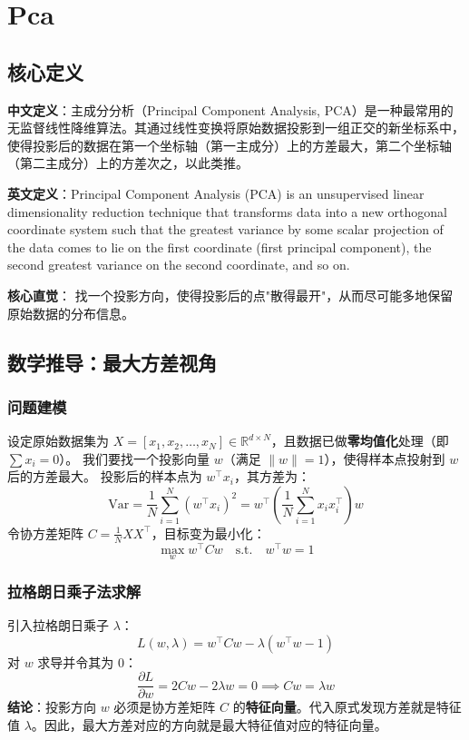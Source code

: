 \documentclass[12pt, a4paper]{book}
\begin{document}
\chapter{Pca}


\section{核心定义}
\textbf{中文定义}：主成分分析（Principal Component Analysis, PCA）是一种最常用的无监督线性降维算法。其通过线性变换将原始数据投影到一组正交的新坐标系中，使得投影后的数据在第一个坐标轴（第一主成分）上的方差最大，第二个坐标轴（第二主成分）上的方差次之，以此类推。

\textbf{英文定义}：Principal Component Analysis (PCA) is an unsupervised linear dimensionality reduction technique that transforms data into a new orthogonal coordinate system such that the greatest variance by some scalar projection of the data comes to lie on the first coordinate (first principal component), the second greatest variance on the second coordinate, and so on.

\textbf{核心直觉}：
找一个投影方向，使得投影后的点"散得最开"，从而尽可能多地保留原始数据的分布信息。

\section{数学推导：最大方差视角}

\subsection{问题建模}
设定原始数据集为 $X = [x_1, x_2, \dots, x_N] \in \mathbb{R}^{d \times N}$，且数据已做\textbf{零均值化}处理（即 $\sum x_i = 0$）。
我们要找一个投影向量 $w$（满足 $\|w\|=1$），使得样本点投射到 $w$ 后的方差最大。
投影后的样本点为 $w^\top x_i$，其方差为：
$$ \text{Var} = \frac{1}{N} \sum_{i=1}^N (w^\top x_i)^2 = w^\top \left( \frac{1}{N} \sum_{i=1}^N x_i x_i^\top \right) w $$
令协方差矩阵 $C = \frac{1}{N} XX^\top$，目标变为最小化：
$$ \max_{w} w^\top C w \quad \text{s.t.} \quad w^\top w = 1 $$

\subsection{拉格朗日乘子法求解}
引入拉格朗日乘子 $\lambda$：
$$ L(w, \lambda) = w^\top C w - \lambda (w^\top w - 1) $$
对 $w$ 求导并令其为 0：
$$ \frac{\partial L}{\partial w} = 2Cw - 2\lambda w = 0 \implies Cw = \lambda w $$
\textbf{结论}：投影方向 $w$ 必须是协方差矩阵 $C$ 的\textbf{特征向量}。代入原式发现方差就是特征值 $\lambda$。因此，最大方差对应的方向就是最大特征值对应的特征向量。
\end{document}
